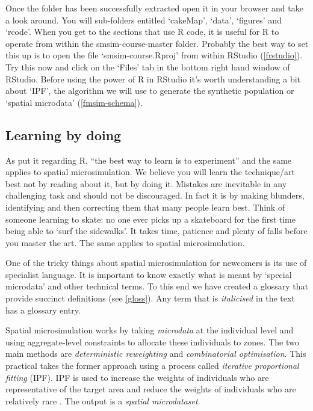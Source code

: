 \documentclass[a4paper, 11pt, twoside]{article}
\begin{document}
Once the folder has been successfully extracted open it in
your browser and take a look around. You will sub-folders
entitled `cakeMap', `data', `figures' and `rcode'. When you get to the
sections that use R code, it is useful for R to operate from
within the smsim-course-master folder. Probably the best way
to set this up is to open the file `smsim-course.Rproj' from
within RStudio (\cref{frstudio}).
Try this now and click on the `Files' tab in
the bottom right hand window of RStudio.
Before using the power of R in RStudio it's worth
understanding a bit about `IPF', the algorithm we will use to generate
the synthetic population or `spatial microdata' (\cref{fmsim-schema}).

\subsection{Learning by doing}

As \citet[xxii]{kabacoff2011r} put it regarding R, ``the best
way to learn is to experiment'' and the same applies to spatial microsimulation.
We believe you will learn the technique/art best not by reading about it, 
but by doing it. Mistakes are inevitable in any challenging task and should not
be discouraged. In fact it is by making blunders, identifying and then correcting them
that many people learn best. Think of someone learning to skate: no one ever
picks up a skateboard for the first time being able to `surf the sidewalks'. It
takes time, patience and plenty of falls before you master the art.
The same applies to spatial microsimulation.

One of the tricky things about spatial microsimulation for newcomers is its use
of specialist language. It is important to know exactly what is meant by
`special microdata' and other technical terms. To this end we have created a
glossary that provide succinct definitions (see \cref{gloss}). Any term that is
\emph{italicised} in the text has a glossary entry.

Spatial microsimulation works by taking \emph{microdata} at the individual level
and using aggregate-level constraints to allocate these individuals to zones.
The two main methods are \emph{deterministic reweighting} and \emph{combinatorial optimisation}.
This practical takes the former approach using a process called \emph{iterative proportional fitting}
(IPF). IPF is used to increase the weights of individuals who are representative
of the target area and reduce the weights of individuals who are relatively
rare \citep{Lovelace2013-trs}.
The output is a \emph{spatial microdataset}.
\end{document}
